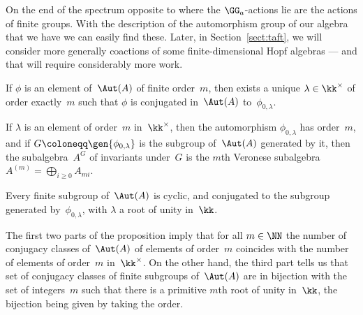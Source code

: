\bigskip

On the end of the spectrum opposite to where the $\GG_a$-actions lie are
the actions of finite groups. With the description of the automorphism
group of our algebra that we have we can easily find these. Later,
in Section~\ref{sect:taft}, we will consider more generally coactions of
some finite-dimensional Hopf algebras --- and that will require considerably
more work.

\begin{Proposition}\label{prop:finite-subgroups}\mbox{}
\begin{thmlist}

\item If $\phi$ is an element of~$\Aut(A)$ of finite order~$m$, then exists
a unique $\lambda\in\kk^\times$ of order exactly~$m$ such that $\phi$ is
conjugated in~$\Aut(A)$ to~$\phi_{0,\lambda}$.

\item If $\lambda$ is an element of order~$m$ in~$\kk^\times$, then the
automorphism $\phi_{0,\lambda}$ has order~$m$, and if 
$G\coloneqq\gen{\phi_{0,\lambda}}$ is the subgroup of~$\Aut(A)$ generated
by it, then the subalgebra~$A^G$ of invariants
under~$G$ is the $m$th Veronese subalgebra
$A^{(m)}=\bigoplus_{i\geq0}A_{mi}$.

\item Every finite subgroup of~$\Aut(A)$ is cyclic, and conjugated to the
subgroup generated by~$\phi_{0,\lambda}$, with $\lambda$ a root of unity
in~$\kk$. 

\end{thmlist}
\end{Proposition}

The first two parts of the proposition imply that for all $m\in\NN$ the
number of conjugacy classes of~$\Aut(A)$ of elements of order~$m$ coincides
with the number of elements of order~$m$ in~$\kk^\times$. On the other
hand, the third part tells us that set of conjugacy classes of finite
subgroups of~$\Aut(A)$ are in bijection with the set of integers~$m$ such
that there is a primitive $m$th root of unity in~$\kk$, the bijection being
given by taking the order.

